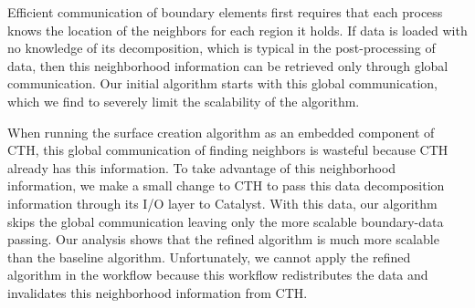 Efficient communication of boundary elements first requires that each
process knows the location of the neighbors for each region it holds.  If
data is loaded with no knowledge of its decomposition, which is typical in
the post-processing of data, then this neighborhood information can be
retrieved only through global communication.  Our initial
 algorithm starts with this global communication, which
we find to severely limit the scalability of the algorithm.

When running the surface creation algorithm as an embedded \insitu
component of CTH, this global communication of finding neighbors is
wasteful because CTH already has this information.  To take advantage of
this neighborhood information, we make a small change to CTH to pass this
data decomposition information through its I/O layer to Catalyst.  With
this data, our  algorithm skips the global communication
leaving only the more scalable boundary-data passing.  Our analysis shows
that the refined algorithm is much more scalable than the baseline
algorithm.  Unfortunately, we cannot apply the refined
algorithm in the \intransit workflow because this workflow redistributes
the data and invalidates this neighborhood information from CTH.
